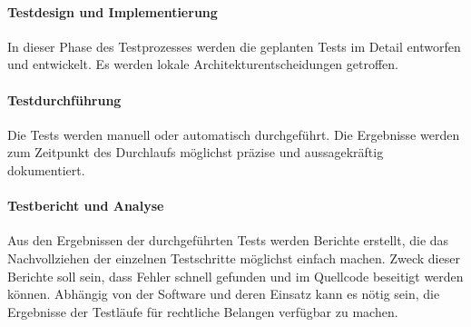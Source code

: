 \paragraph{Testdesign und Implementierung} In dieser Phase des Testprozesses werden die geplanten Tests im Detail entworfen und entwickelt. Es werden lokale Architekturentscheidungen getroffen.

\paragraph{Testdurchführung} Die Tests werden manuell oder automatisch durchgeführt. Die Ergebnisse werden zum Zeitpunkt des Durchlaufs möglichst präzise und aussagekräftig dokumentiert.

\paragraph{Testbericht und Analyse} Aus den Ergebnissen der durchgeführten Tests werden Berichte erstellt, die das Nachvollziehen der einzelnen Testschritte möglichst einfach machen. Zweck dieser Berichte soll sein, dass Fehler schnell gefunden und im Quellcode beseitigt werden können. Abhängig von der Software und deren Einsatz kann es nötig sein, die Ergebnisse der Testläufe für rechtliche Belangen verfügbar zu machen.

